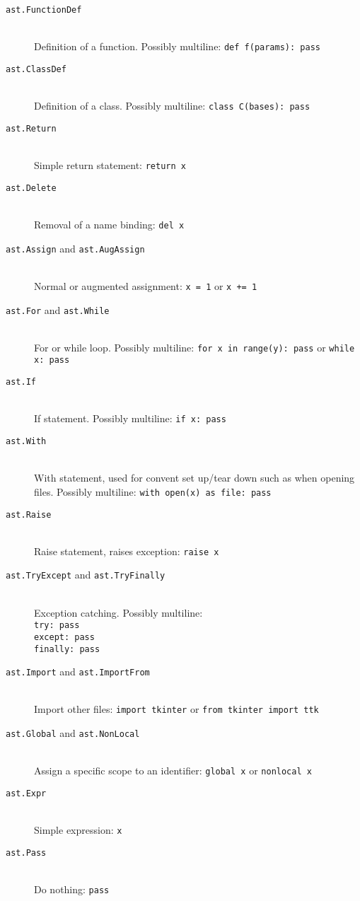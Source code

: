 \documentclass{report}
\begin{document}
\begin{description}
\item[\texttt{ast.FunctionDef}] \hfill \\
Definition of a function. Possibly multiline: \texttt{def f(params): pass}
\item[\texttt{ast.ClassDef}] \hfill \\
Definition of a class. Possibly multiline: \texttt{class C(bases): pass}
\item[\texttt{ast.Return}] \hfill \\
Simple return statement: \texttt{return x}
\item[\texttt{ast.Delete}] \hfill \\
Removal of a name binding: \texttt{del x}
\item[\texttt{ast.Assign} and \texttt{ast.AugAssign}] \hfill \\
Normal or augmented assignment: \texttt{x = 1} or \texttt{x += 1}
\item[\texttt{ast.For} and \texttt{ast.While}] \hfill \\
For or while loop. Possibly multiline: \texttt{for x in range(y): pass} or \texttt{while x: pass}
\item[\texttt{ast.If}] \hfill \\
If statement. Possibly multiline: \texttt{if x: pass}
\item[\texttt{ast.With}] \hfill \\
With statement, used for convent set up/tear down such as when opening files. Possibly multiline: \texttt{with open(x) as file: pass}
\item[\texttt{ast.Raise}] \hfill \\
Raise statement, raises exception: \texttt{raise x}
\item[\texttt{ast.TryExcept} and \texttt{ast.TryFinally}] \hfill \\
Exception catching. Possibly multiline: \\
\texttt{try: pass} \\
\texttt{except: pass} \\
\texttt{finally: pass}
\item[\texttt{ast.Import} and \texttt{ast.ImportFrom}] \hfill \\
Import other files: \texttt{import tkinter} or \texttt{from tkinter import ttk}
\item[\texttt{ast.Global} and \texttt{ast.NonLocal}] \hfill \\
Assign a specific scope to an identifier: \texttt{global x} or \texttt{nonlocal x}
\item[\texttt{ast.Expr}] \hfill \\
Simple expression: \texttt{x}
\item[\texttt{ast.Pass}] \hfill \\
Do nothing: \texttt{pass}
\end{description}
\end{document}
